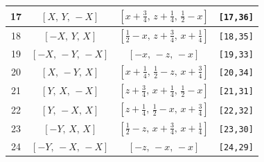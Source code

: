 \documentclass[fleqn,8pt]{jsarticle}
\begin{document}
\begin{longtable}{cccc}
17 & $\left[ X,\, Y,\, - X \right]$ & $\left[ x + \frac{3}{4},\, z + \frac{1}{4},\, \frac{1}{2} - x \right]$ & {\tt [17,36]} \\ \hline
18 & $\left[ - X,\, Y,\, X \right]$ & $\left[ \frac{1}{2} - x,\, z + \frac{3}{4},\, x + \frac{1}{4} \right]$ & {\tt [18,35]} \\ \hline
19 & $\left[ - X,\, - Y,\, - X \right]$ & $\left[ - x,\, - z,\, - x \right]$ & {\tt [19,33]} \\ \hline
20 & $\left[ X,\, - Y,\, X \right]$ & $\left[ x + \frac{1}{4},\, \frac{1}{2} - z,\, x + \frac{3}{4} \right]$ & {\tt [20,34]} \\ \hline
21 & $\left[ Y,\, X,\, - X \right]$ & $\left[ z + \frac{3}{4},\, x + \frac{1}{4},\, \frac{1}{2} - x \right]$ & {\tt [21,31]} \\ \hline
22 & $\left[ Y,\, - X,\, X \right]$ & $\left[ z + \frac{1}{4},\, \frac{1}{2} - x,\, x + \frac{3}{4} \right]$ & {\tt [22,32]} \\ \hline
23 & $\left[ - Y,\, X,\, X \right]$ & $\left[ \frac{1}{2} - z,\, x + \frac{3}{4},\, x + \frac{1}{4} \right]$ & {\tt [23,30]} \\ \hline
24 & $\left[ - Y,\, - X,\, - X \right]$ & $\left[ - z,\, - x,\, - x \right]$ & {\tt [24,29]} \\
\end{longtable}
\renewcommand{\arraystretch}{1.2}
\end{document}
